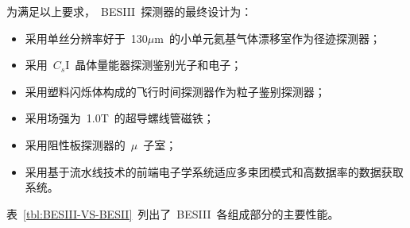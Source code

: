 为满足以上要求，~BESIII~探测器的最终设计为：
\begin{itemize}
\item{采用单丝分辨率好于~130$\mu$m~的小单元氦基气体漂移室作为径迹探测器；}
\item{采用~$C_{s}$I~晶体量能器探测鉴别光子和电子；}
\item{采用塑料闪烁体构成的飞行时间探测器作为粒子鉴别探测器；}
\item{采用场强为~1.0T~的超导螺线管磁铁；}
\item{采用阻性板探测器的~$\mu$~子室；}
\item{采用基于流水线技术的前端电子学系统适应多束团模式和高数据率的数据获取系统。}
\end{itemize}

表~\ref{tbl:BESIII-VS-BESII}~列出了~BESIII~各组成部分的主要性能。
\begin{table}[h]
	\centering
	\caption{\label{tbl:BESIII-VS-BESII} BESIII~和~BESII~探测器的比较}
\end{table}

